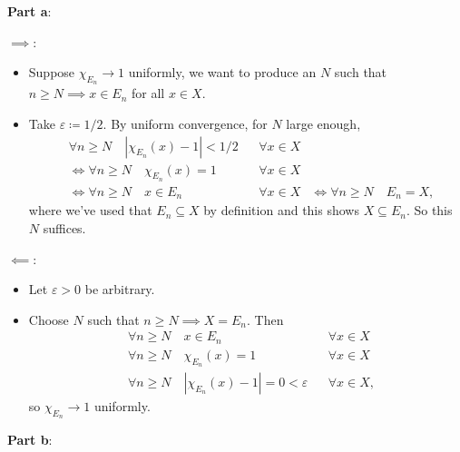 \begin{solution}

\textbf{Part a}:

\(\implies\):

\begin{itemize}
\tightlist
\item
  Suppose \(\chi_{E_n}\to 1\) uniformly, we want to produce an \(N\)
  such that \(n\geq N \implies x\in E_n\) for all \(x\in X\).
\item
  Take \({\varepsilon}\coloneqq 1/2\). By uniform convergence, for \(N\)
  large enough,
  \begin{align*}
  & \forall n\geq N \quad {\left\lvert {\chi_{E_n}(x) - 1} \right\rvert} < 1/2 && \forall x\in X\\
  &\iff
  \forall n\geq N \quad \chi_{E_n}(x) = 1 && \forall x\in X \\
  &\iff 
  \forall n\geq N \quad x\in E_n && \forall x\in X
  &\iff 
  \forall n\geq N \quad E_n = X
  ,\end{align*}
  where we've used that \(E_n \subseteq X\) by definition and this shows
  \(X \subseteq E_n\). So this \(N\) suffices.
\end{itemize}

\(\impliedby\):

\begin{itemize}
\tightlist
\item
  Let \({\varepsilon}> 0\) be arbitrary.
\item
  Choose \(N\) such that \(n\geq N \implies X = E_n\). Then
  \begin{align*}
  &\forall n\geq N \quad x\in E_n && \forall x\in X \\
  &\forall n\geq N \quad \chi_{E_n}(x) = 1 && \forall x\in X \\
  &\forall n\geq N \quad {\left\lvert {\chi_{E_n}(x) - 1} \right\rvert} = 0 < {\varepsilon}&& \forall x\in X 
  ,\end{align*}
  so \(\chi_{E_n} \to 1\) uniformly.
\end{itemize}

\textbf{Part b}:


\end{solution}
